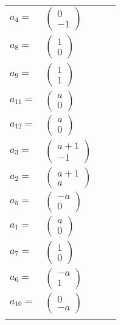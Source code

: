 \documentclass[1p]{elsarticle_modified}
\theoremstyle{definition}
\begin{document}
\begin{tabular}{m{7pt} m{180pt} m{7pt} m{180pt} }
\flushright $a_{4}=$&$\begin{pmatrix}0\\-1\end{pmatrix}$ \\
\flushright $a_{8}=$&$\begin{pmatrix}1\\0\end{pmatrix}$ \\
\flushright $a_{9}=$&$\begin{pmatrix}1\\1\end{pmatrix}$ \\
\flushright $a_{11}=$&$\begin{pmatrix}a\\0\end{pmatrix}$ \\
\flushright $a_{12}=$&$\begin{pmatrix}a\\0\end{pmatrix}$ \\
\flushright $a_{3}=$&$\begin{pmatrix}a+1\\-1\end{pmatrix}$ \\
\flushright $a_{2}=$&$\begin{pmatrix}a+1\\a\end{pmatrix}$ \\
\flushright $a_{5}=$&$\begin{pmatrix}- a\\0\end{pmatrix}$ \\
\flushright $a_{1}=$&$\begin{pmatrix}a\\0\end{pmatrix}$ \\
\flushright $a_{7}=$&$\begin{pmatrix}1\\0\end{pmatrix}$ \\
\flushright $a_{6}=$&$\begin{pmatrix}- a\\1\end{pmatrix}$ \\
\flushright $a_{10}=$&$\begin{pmatrix}0\\- a\end{pmatrix}$\\&\end{tabular}
\end{document}

